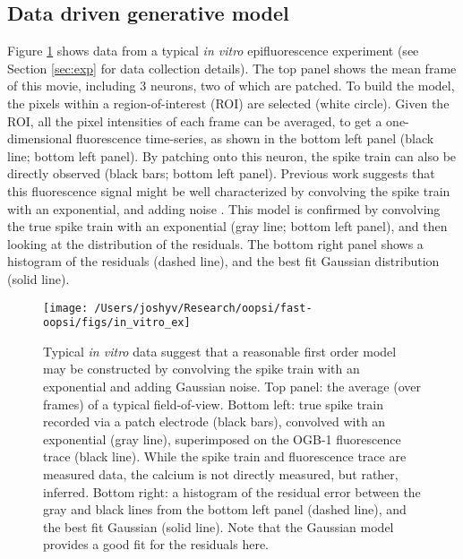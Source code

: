 \subsection{Data driven generative model} \label{sec:model}

Figure \ref{fig:in_vitro_ex} shows data from a typical \emph{in vitro} epifluorescence experiment (see Section \ref{sec:exp} for data collection details).  The top panel shows the mean frame of this movie, including 3 neurons, two of which are patched.  To build the model, the pixels within a region-of-interest (ROI) are selected (white circle).  Given the ROI, all the pixel intensities of each frame can be averaged, to get a one-dimensional fluorescence time-series, as shown in the bottom left panel (black line; bottom left panel).  By patching onto this neuron, the spike train can also be directly observed (black bars; bottom left panel). Previous work suggests that this fluorescence signal might be well characterized by convolving the spike train with an exponential, and adding noise \cite{ImagingManual}.  This model is confirmed by convolving the true spike train with an exponential (gray line; bottom left panel), and then looking at the distribution of the residuals.  The bottom right panel shows a histogram of the residuals (dashed line), and the best fit Gaussian distribution (solid line).


\begin{figure}[h!]
\centering \texttt{[image: /Users/joshyv/Research/oopsi/fast-oopsi/figs/in\_vitro\_ex]}
\caption[data-based model]{Typical \emph{in vitro} data suggest that a reasonable first order model may be constructed by convolving the spike train with an exponential and adding Gaussian noise. Top panel: the average (over frames) of a typical field-of-view.  Bottom left: true spike train recorded via a patch electrode (black bars), convolved with an exponential (gray line), superimposed on the OGB-1 fluorescence trace (black line).  While the spike train and fluorescence trace are measured data, the calcium is not directly measured, but rather, inferred.  Bottom right: a histogram of the residual error between the gray and black lines from the bottom left panel (dashed line), and the best fit Gaussian (solid line). Note that the Gaussian model provides a good fit for the residuals here.} \label{fig:in_vitro_ex}
\end{figure}


